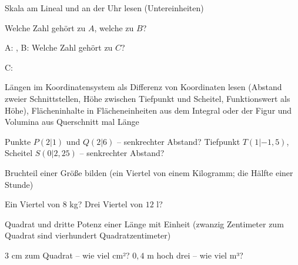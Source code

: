 \begin{aufgabe}{Skala am Lineal und an der Uhr lesen (Untereinheiten)}
\begin{teile}
\teil Welche Zahl gehört zu $A$, welche zu $B$?

A: \leerfeld , B: \leerfeld
\teil Welche Zahl gehört zu $C$?

C: \leerfeld
\end{teile}
\end{aufgabe}

\begin{aufgabe}{Längen im Koordinatensystem als Differenz von Koordinaten lesen (Abstand zweier Schnittstellen, Höhe zwischen Tiefpunkt und Scheitel, Funktionswert als Höhe), Flächeninhalte in Flächeneinheiten aus dem Integral oder der Figur und Volumina aus Querschnitt mal Länge}
\begin{teile}
\teil Punkte $P(2|1)$ und $Q(2|6)$ – senkrechter Abstand? \leerfeld
\teil Tiefpunkt $T(1|-1{,}5)$, Scheitel $S(0|2{,}25)$ – senkrechter Abstand? \leerfeld
\end{teile}
\end{aufgabe}

\begin{aufgabe}{Bruchteil einer Größe bilden (ein Viertel von einem Kilogramm; die Hälfte einer Stunde)}
\begin{teile}
\teil Ein Viertel von $8$ kg? \leerfeld[kg]
\teil Drei Viertel von $12$ l? \leerfeld[l]
\end{teile}
\end{aufgabe}

\begin{aufgabe}{Quadrat und dritte Potenz einer Länge mit Einheit (zwanzig Zentimeter zum Quadrat sind vierhundert Quadratzentimeter)}
\begin{teile}
\teil $3$ cm zum Quadrat – wie viel cm²? \leerfeld[cm²]
\teil $0{,}4$ m hoch drei – wie viel m³? \leerfeld[m³]
\end{teile}
\end{aufgabe}

